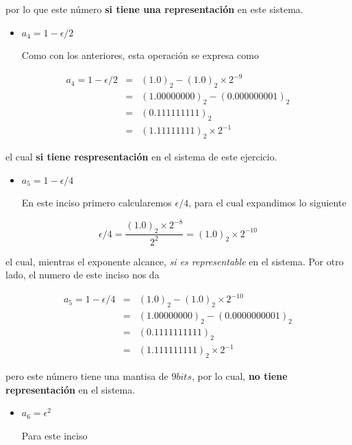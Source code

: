\documentclass[11pt]{article}
\providecommand{\tightlist}{%
      \setlength{\itemsep}{0pt}\setlength{\parskip}{0pt}}
\begin{document}
por lo que este número \textbf{si tiene una representación} en este
sistema.

\begin{itemize}
\tightlist
\item
  \(a_4 = 1- \epsilon/2\)

  \par

  Como con los anteriores, esta operación se expresa como
\end{itemize}

\begin{eqnarray*}
     a_4 = 1- \epsilon/2 &=& (1.0)_2 - (1.0)_2 \times 2^{-9} \\
         &=& (1.00000000)_2 - (0.000000001)_2 \\
         &=& (0.111111111)_2 \\
         &=& (1.11111111)_2 \times 2^{-1}
 \end{eqnarray*}

el cual \textbf{si tiene respresentación} en el sistema de este
ejercicio.

\begin{itemize}
\tightlist
\item
  \(a_5 = 1- \epsilon/4\)

  \par

  En este inciso primero calcularemos \(\epsilon/4\), para el cual
  expandimos lo siguiente
\end{itemize}

\begin{equation*} \epsilon/4 = \frac{(1.0)_2 \times 2^{-8}}{2^2} = (1.0)_2 \times 2^{-10}
 \end{equation*}

el cual, mientras el exponente alcance, \emph{si es representable} en el
sistema. Por otro lado, el numero de este inciso nos da

\begin{eqnarray*}
     a_5 = 1 - \epsilon/4 &=& (1.0)_2 - (1.0)_2 \times 2^{-10} \\
         &=& (1.00000000)_2 - (0.0000000001)_2 \\
         &=& (0.1111111111)_2 \\
         &=& (1.111111111)_2 \times 2^{-1}
 \end{eqnarray*}

pero este número tiene una mantisa de \(9bits\), por lo cual, \textbf{no
tiene representación} en el sistema.

\begin{itemize}
\tightlist
\item
  \(a_6 = \epsilon^2\)

  \par

  Para este inciso
\end{itemize}
\end{document}
